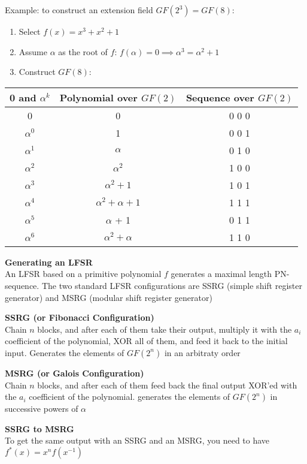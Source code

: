 \documentclass[10pt,letterpaper,landscape]{report}
\newcommand{\boxheight}{21.59cm}
\newcommand{\boxwidth}{8.85cm}
\begin{document}
\begin{small}
{\begin{minipage}[t][\boxheight][c]{\boxwidth}
    Example: to construct an extension field $GF(2^3) = GF(8)$:
    \begin{enumerate}
        \item Select $f(x) = x^3 + x^2 + 1$
        \item Assume $\alpha$ as the root of $f$: $f(\alpha) = 0 \implies \alpha^3 = \alpha^2 + 1$
        \item Construct $GF(8)$: \\
    \end{enumerate}
    \begin{tabular}{|c|c|c|}
        \hline
        0 and $\alpha^k$ & Polynomial over $GF(2)$ & Sequence over $GF(2)$ \\
        \hline
        0 & 0 & 0 0 0 \\
        $\alpha^0$ & 1 & 0 0 1 \\
        $\alpha^1$ & $\alpha$ & 0 1 0 \\
        $\alpha^2$ & $\alpha^2$ & 1 0 0 \\
        $\alpha^3$ & $\alpha^2 + 1$ & 1 0 1 \\
        $\alpha^4$ & $\alpha^2 + \alpha + 1$ & 1 1 1 \\
        $\alpha^5$ & $\alpha$ + 1 & 0 1 1 \\
        $\alpha^6$ & $\alpha^2 + \alpha$ & 1 1 0\\
        \hline
    \end{tabular}
    
    \textbf{Generating an LFSR}\\
    An LFSR based on a primitive polynomial $f$ generates a maximal length PN-sequence. The two standard LFSR configurations are SSRG (simple shift register generator) and MSRG (modular shift register generator)
    
    \textbf{SSRG (or Fibonacci Configuration)}\\
    Chain $n$ blocks, and after each of them take their output, multiply it with the $a_i$ coefficient of the polynomial, XOR all of them, and feed it back to the initial input. Generates the elements of $GF(2^n)$ in an arbitraty order
    
    \textbf{MSRG (or Galois Configuration)}\\
    Chain $n$ blocks, and after each of them feed back the final output XOR'ed with the $a_i$ coefficient of the polynomial. generates the elements of $GF(2^n)$ in successive powers of $\alpha$
    
    \textbf{SSRG to MSRG}\\
    To get the same output with an SSRG and an MSRG, you need to have $f^*(x) = x^n f(x^{-1})$
    

\end{minipage}}
\end{small}
\end{document}
